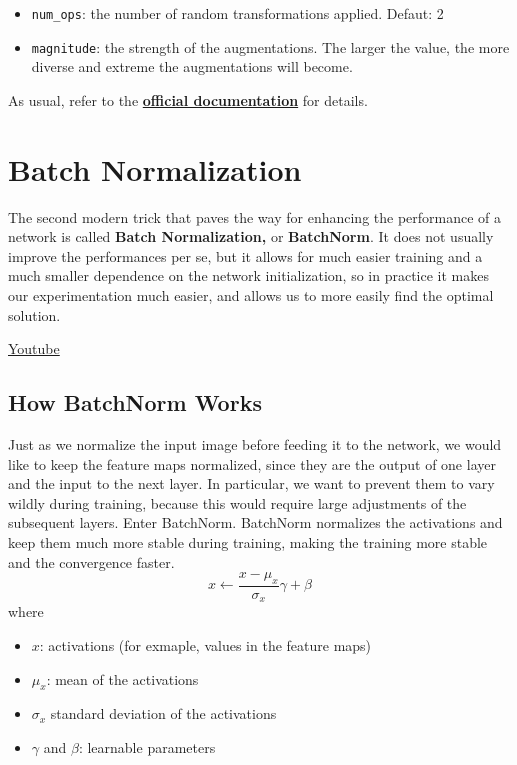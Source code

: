 \begin{itemize}
    \item \lstinline{num_ops}: the number of random transformations applied. Defaut: 2
    \item \lstinline{magnitude}: the strength of the augmentations. The larger the value, the more diverse and extreme the augmentations will become.
\end{itemize}
As usual, refer to the \href{https://pytorch.org/vision/main/generated/torchvision.transforms.RandAugment.html\#torchvision.transforms.RandAugment}{\textbf{official documentation}} for details.

\section{Batch Normalization}

The second modern trick that paves the way for enhancing the performance of a network is called \textbf{Batch Normalization,} or \textbf{BatchNorm}. It does not usually improve the performances per se, but it allows for much easier training and a much smaller dependence on the network initialization, so in practice it makes our experimentation much easier, and allows us to more easily find the optimal solution. \newline

\href{https://www.youtube.com/watch?v=Ot2ObfYuGKk&t=3s&ab_channel=Udacity}{Youtube}

\subsection{How BatchNorm Works}

Just as we normalize the input image before feeding it to the network, we would like to keep the feature maps normalized, since they are the output of one layer and the input to the next layer. In particular, we want to prevent them to vary wildly during training, because this would require large adjustments of the subsequent layers. Enter BatchNorm. BatchNorm normalizes the activations and keep them much more stable during training, making the training more stable and the convergence faster. \[x \leftarrow \frac{x - \mu_x}{\sigma_x} \gamma + \beta\]
where 
\begin{itemize}
    \item \(x\): activations (for exmaple, values in the feature maps)
    \item \(\mu_x\): mean of the activations
    \item \(\sigma_x\) standard deviation of the activations
    \item \(\gamma\) and \(\beta\): learnable parameters
\end{itemize}

